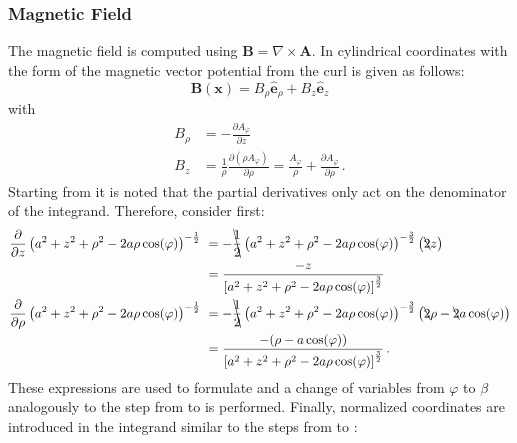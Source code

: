 \subsubsection{Magnetic Field}
The magnetic field is computed using $\mathbf{B} = \nabla \times \mathbf{A}$.
In cylindrical coordinates with the form of the magnetic vector potential from 
the curl is given as follows:
\begin{equation}
  \mathbf{B}(\mathbf{x})
= B_\rho \hat{\mathbf{e}}_\rho + B_z \hat{\mathbf{e}}_z
\end{equation}
with
\begin{align}
  B_\rho &= -                \frac{\partial       A_\varphi }{\partial z   }  \label{eqn:b_rho_start} \\
  B_z    &=   \frac{1}{\rho} \frac{\partial (\rho A_\varphi)}{\partial \rho}
          = \frac{A_\varphi}{\rho} + \frac{\partial A_\varphi}{\partial \rho} \label{eqn:b_z_start} \, .
\end{align}
Starting from  it is noted that the partial derivatives only act on the denominator of the integrand.
Therefore, consider first:
\begin{align}
  \frac{\partial}{\partial z} \left( a^2 + z^2 + \rho^2 - 2 a \rho \cos(\varphi) \right)^{-\frac{1}{2}}
  ~ &= - \bcancel{\frac{1}{2}} \left( a^2 + z^2 + \rho^2 - 2 a \rho \cos(\varphi) \right)^{-\frac{3}{2}} \left( \bcancel{2} z \right) \nonumber \\
  ~ &= \frac{- z}{\left[ a^2 + z^2 + \rho^2 - 2 a \rho \cos(\varphi) \right]^{\frac{3}{2}}} \\
  \frac{\partial}{\partial \rho} \left( a^2 + z^2 + \rho^2 - 2 a \rho \cos(\varphi) \right)^{-\frac{1}{2}}
  ~ &= - \bcancel{\frac{1}{2}} \left( a^2 + z^2 + \rho^2 - 2 a \rho \cos(\varphi) \right)^{-\frac{3}{2}} \left( \bcancel{2} \rho - \bcancel{2} a \cos(\varphi) \right) \nonumber \\
  ~ &= \frac{-(\rho - a \cos(\varphi))}{\left[ a^2 + z^2 + \rho^2 - 2 a \rho \cos(\varphi) \right]^{\frac{3}{2}}} \, .
\end{align}
These expressions are used to formulate  and
a change of variables from $\varphi$ to $\beta$ analogously to the step from  to  is performed.
Finally, normalized coordinates are introduced in the integrand similar to the steps from  to :
